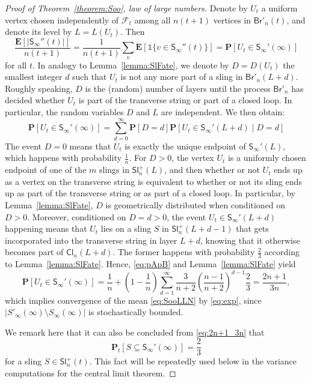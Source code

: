 \documentclass[a4paper,11pt,reqno]{amsart}
\newcommand{\paul}[1]{\todo[color=yellow!70,inline]{Paul: #1}}
\newcommand{\bP}{\mathbf{P}}
\newcommand{\bE}{\mathbf{E}}
\newcommand{\one}{\mathds{1}}
\newcommand{\Br}{\mathsf{Br}}
\newcommand{\Slr}{\mathsf{Sl}^+}
\newcommand{\Soo}{\mathsf{S}_\infty}
\newcommand{\Cl}{\mathsf{Cl}}
\newcommand{\F}{\mathscr{F}}
\newcommand{\ssq}{\subseteq}
\theoremstyle{definition}
\begin{document}
\begin{proof}[Proof of Theorem~\ref{theorem:Soo}, law of large numbers]
 Denote by $U_t$ a uniform vertex chosen independently of $\F_t$ among all $n(t+1)$ vertices in $\Br'_n(t)$, and denote its level by $L=L(U_t)$. Then 
 \begin{equation}
 \label{eq:exp}
  \frac{\bE[|\Soo''(t)|]}{n(t+1)}=\frac{1}{n(t+1)}\sum_v \bE[\one\{v\in\Soo''(t)\}]=\bP[U_t\in \Soo'(\infty)]
 \end{equation}
 for all $t$.  
 In analogy to Lemma~\ref{lemma:SlFate}, we denote by $D=D(U_t)$ the smallest integer $d$ such that $U_t$ is not any more part of a sling in $\Br'_n(L+d)$. Roughly speaking, $D$ is the (random) number of layers until the process $\Br'_n$ has decided whether $U_t$ is part of the transverse string or part of a closed loop. In particular, the random variables $D$ and $L$ are independent. We then obtain: 
 \begin{equation}\label{eq:pApB}
  \bP[U_t\in \Soo'(\infty)] = \sum_{d=0}^\infty \bP[D=d]\bP[U_t\in \Soo'(L+d)\mid D=d]
 \end{equation}
 The event $D=0$ means that $U_t$ is exactly the unique endpoint of $\Soo'(L)$, which happens with probability $\frac{1}{n}$. For $D>0$, the vertex $U_t$ is a uniformly chosen endpoint of one of the $m$ slings in $\Slr_n(L)$, and then whether or not $U_t$ ends up as a vertex on the transverse string is equivalent to whether or not its sling ends up as part of the transverse string or as part of a closed loop. In particular, by Lemma~\ref{lemma:SlFate}, $D$ is geometrically distributed when conditioned on $D>0$. Moreover, conditioned on $D=d>0$, the event $U_t\in\Soo'(L+d)$ happening means that $U_t$ lies on a sling $S$ in $\Slr_n(L+d-1)$ that gets incorporated into the transverse string in layer $L+d$, knowing that it otherwise becomes part of $\Cl_n(L+d)$. The former happens with probability $\frac{2}{3}$ according to Lemma~\ref{lemma:SlFate}. Hence, \eqref{eq:pApB} and Lemma~\ref{lemma:SlFate} yield
 \begin{equation}\label{eq:2n+1_3n}
  \bP[U_t\in \Soo'(\infty)]
  = \frac{1}{n}+\left(1-\frac{1}{n}\right)\sum_{d=1}^\infty \frac{3}{n+2}\left(\frac{n-1}{n+2}\right)^{d-1} \frac{2}{3}
  = \frac{2n+1}{3n},
 \end{equation}
 which implies convergence of the mean \eqref{eq:SooLLN} by \eqref{eq:exp}, since $|S'_\infty(\infty) \setminus S_\infty(\infty)|$ is stochastically bounded. 
 
We remark here that it can also be concluded from \eqref{eq:2n+1_3n} that 
 \begin{equation}\label{eq:23}
  \bP_t[S\ssq\Soo'(\infty)]=\frac{2}{3}
 \end{equation}
 for a sling $S\in\Slr_n(t)$. 
 This fact will be repeatedly used below in the variance computations for the central limit theorem. 


\end{proof}
\end{document}
